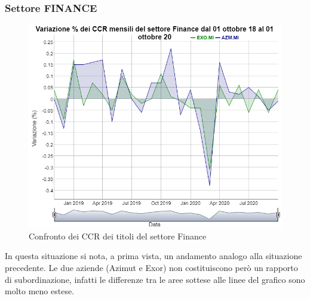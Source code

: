 \documentclass[12pt]{article}
\begin{document}
\subsubsection{Settore FINANCE}
\begin{figure}[!htb]
    \centering
    \includegraphics[width=1\textwidth]{immagini/setFin.png}
    \caption{Confronto dei CCR dei titoli del settore Finance}
\end{figure}
\FloatBarrier
In questa situazione si nota, a prima vista, un andamento analogo alla situazione precedente. Le due aziende (Azimut e Exor) non costituiscono però un rapporto di subordinazione, infatti le differenze tra le aree sottese alle linee del grafico sono molto meno estese.
\newpage
\end{document}
